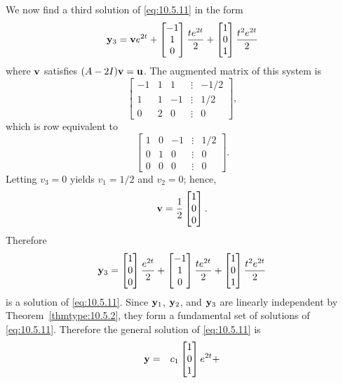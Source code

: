\documentclass{ximera}
\begin{document}
\begin{example}
\begin{explanation}
We  now find a third solution of  \eqref{eq:10.5.11}  in the form
$$
{\bf y}_3={\bf
v}e^{2t}+\begin{bmatrix}-1\\1\\0\end{bmatrix}\frac{te^{2t}}{2}+\begin{bmatrix}1\\0\\1\end{bmatrix}\frac{t^2e^{2t}}{2}
$$
where ${\bf v}$ satisfies $(A-2I){\bf v}={\bf u}$.
The  augmented matrix  of this system is
$$
\begin{bmatrix} -1 & 1 & 1 &\vdots &-1/2\\
1& 1 & -1 &\vdots & 1/2\\ 0 & 2 & 0 &
\vdots & 0\end{bmatrix}, $$
which is row equivalent to
$$
\begin{bmatrix} 1 & 0 &- 1 &\vdots& 1/2\\ 0 & 1 & 0
&\vdots& 0\\ 0 & 0 & 0 &\vdots&0\end{bmatrix}.
$$
Letting $v_3=0$ yields $v_1=1/2$ and $v_2=0$; hence,
$$
{\bf v}=\frac{1}{2}\begin{bmatrix}1\\0\\0\end{bmatrix}.
$$
Therefore
$$
{\bf y}_3=\begin{bmatrix}1\\0\\0\end{bmatrix}\frac{e^{2t}}{2}+
\begin{bmatrix}-1\\1\\0\end{bmatrix}\frac{te^{2t}}{2}+\begin{bmatrix}1\\0\\1\end{bmatrix}\frac{t^2e^{2t}}{2}
$$
is a solution of  \eqref{eq:10.5.11}. Since ${\bf y}_1$, ${\bf y}_2$, and
${\bf y}_3$ are linearly independent by Theorem~\ref{thmtype:10.5.2}, they
form a fundamental set of solutions of \eqref{eq:10.5.11}. Therefore the
general solution of \eqref{eq:10.5.11} is
\begin{eqnarray*}
{\bf y} &=&c_1\begin{bmatrix}1\\0\\1\end{bmatrix}e^{2t}+

\end{eqnarray*}
\end{explanation}
\end{example}
\end{document}
